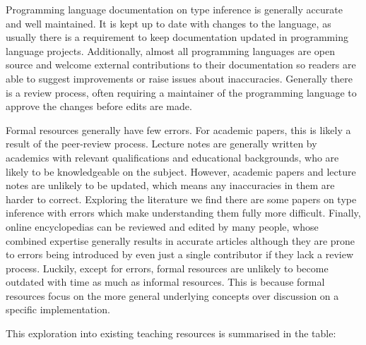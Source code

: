 \documentclass[a4paper,fleqn,oneside,12pt]{report}
\begin{document}
Programming language documentation on type inference is generally accurate and well maintained. It is kept up to date with changes to the language, as usually there is a requirement to keep documentation updated in programming language projects. Additionally, almost all programming languages are open source and welcome external contributions to their documentation so readers are able to suggest improvements or raise issues about inaccuracies. Generally there is a review process, often requiring a maintainer of the programming language to approve the changes before edits are made.

Formal resources generally have few errors. For academic papers, this is likely a result of the peer-review process. Lecture notes are generally written by academics with relevant qualifications and educational backgrounds, who are likely to be knowledgeable on the subject. However, academic papers and lecture notes are unlikely to be updated, which means any inaccuracies in them are harder to correct. Exploring the literature we find there are some papers on type inference with errors which make understanding them fully more difficult. Finally, online encyclopedias can be reviewed and edited by many people, whose combined expertise generally results in accurate articles although they are prone to errors being introduced by even just a single contributor if they lack a review process. Luckily, except for errors, formal resources are unlikely to become outdated with time as much as informal resources. This is because formal resources focus on the more general underlying concepts over discussion on a specific implementation.

This exploration into existing teaching resources is summarised in the table:
\end{document}
